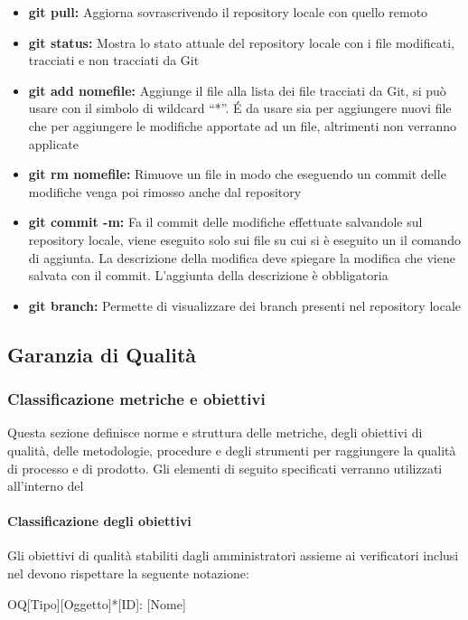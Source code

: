 \begin{itemize}
  \item\textbf{git pull:} Aggiorna sovrascrivendo il repository locale con quello remoto
  \item\textbf{git status:} Mostra lo stato attuale del repository locale con i file modificati,
tracciati e non tracciati da Git
  \item\textbf{git add nomefile:} Aggiunge il file alla lista dei file tracciati da Git, si può usare con il simbolo di wildcard “*”. \'E da usare sia per aggiungere nuovi file che per aggiungere le modifiche apportate ad un file, altrimenti non verranno applicate
  \item\textbf{git rm nomefile:} Rimuove un file in modo che eseguendo un commit delle modifiche venga poi rimosso anche dal repository
  \item\textbf{git commit -m:} Fa il commit delle modifiche effettuate salvandole sul repository locale, viene eseguito solo sui file su cui si è eseguito un il comando di aggiunta. La descrizione della modifica deve spiegare la modifica che viene salvata con il commit. L’aggiunta della descrizione è obbligatoria
  \item\textbf{git branch:} Permette di visualizzare dei branch presenti nel repository locale
\end{itemize}




\newpage






\subsection{Garanzia di Qualità}
\subsubsection{Classificazione metriche e obiettivi}
Questa sezione definisce norme e struttura delle metriche, degli obiettivi di qualità,  
delle metodologie, procedure e degli strumenti per raggiungere la qualità di processo e di prodotto.  
Gli elementi di seguito specificati verranno utilizzati all'interno del 
\pianodiqualifica

\paragraph{Classificazione degli obiettivi}
Gli obiettivi di qualità stabiliti dagli amministratori assieme ai verificatori inclusi nel \pianodiqualifica devono rispettare 
la seguente notazione:
\begin{center}
    OQ[Tipo][Oggetto]*[ID]: [Nome]
\end{center}

